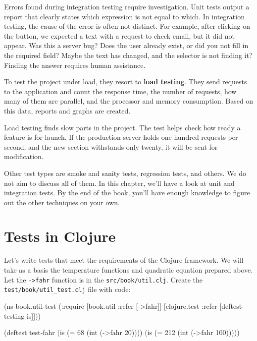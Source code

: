 Errors found during integration testing require investigation. Unit tests output a report that clearly states which expression is not equal to which. In integration testing, the cause of the error is often not distinct. For example, after clicking on the button, we expected a text with a request to check email, but it did not appear. Was this a server bug? Does the user already exist, or did you not fill in the required field? Maybe the text has changed, and the selector is not finding it? Finding the answer requires human assistance.


To test the project under load, they resort to \textbf{load testing}. They send requests to the application and count the response time, the number of requests, how many of them are parallel, and the processor and memory consumption. Based on this data, reports and graphs are created.


Load testing finds slow parts in the project. The test helps check how ready a feature is for launch. If the production server holds one hundred requests per second, and the new section withstands only twenty, it will be sent for modification.

Other test types are smoke and sanity tests, regression tests, and others. We do not aim to discuss all of them. In this chapter, we'll have a look at unit and integration tests. By the end of the book, you'll have enough knowledge to figure out the other techniques on your own.

\section{Tests in Clojure}

Let's write tests that meet the requirements of the Clojure framework. We will take as a basis the temperature functions and quadratic equation prepared above. Let the \verb|->fahr| function is in the \texttt{src/book/util\-.clj}. Create the \verb|test/book/util_test.clj| file with code:


\ifx\DEVICETYPE\MOBILE

\begin{english}
  \begin{clojure}
(ns book.util-test
  (:require
   [book.util :refer [->fahr]]
   [clojure.test :refer
    [deftest testing is]]))

(deftest test-fahr
  (is (= 68 (int (->fahr 20))))
  (is (= 212 (int (->fahr 100)))))
  \end{clojure}
\end{english}

